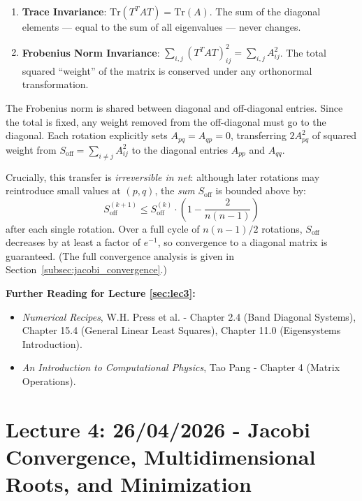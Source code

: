 \documentclass[12pt, a4paper]{article}
\begin{document}
\begin{enumerate}
    \item \textbf{Trace Invariance}: $\mathrm{Tr}(T^T A T) = \mathrm{Tr}(A)$. The sum of the diagonal elements — equal to the sum of all eigenvalues — never changes.
    \item \textbf{Frobenius Norm Invariance}: $\sum_{i,j}(T^T A T)_{ij}^2 = \sum_{i,j} A_{ij}^2$. The total squared ``weight'' of the matrix is conserved under any orthonormal transformation.
\end{enumerate}

\begin{tcolorbox}[colback=green!5!white,colframe=green!50!black,title=Why the Algorithm Must Converge]
The Frobenius norm is shared between diagonal and off-diagonal entries. Since the total is fixed, any weight removed from the off-diagonal must go to the diagonal. Each rotation explicitly sets $A_{pq} = A_{qp} = 0$, transferring $2A_{pq}^2$ of squared weight from $S_{\text{off}} = \sum_{i \neq j} A_{ij}^2$ to the diagonal entries $A_{pp}$ and $A_{qq}$.

Crucially, this transfer is \emph{irreversible in net}: although later rotations may reintroduce small values at $(p,q)$, the \emph{sum} $S_{\text{off}}$ is bounded above by:
\begin{equation}
S_{\text{off}}^{(k+1)} \leq S_{\text{off}}^{(k)} \cdot \left(1 - \frac{2}{n(n-1)}\right)
\end{equation}
after each single rotation. Over a full cycle of $n(n-1)/2$ rotations, $S_{\text{off}}$ decreases by at least a factor of $e^{-1}$, so convergence to a diagonal matrix is guaranteed. (The full convergence analysis is given in Section~\ref{subsec:jacobi_convergence}.)
\end{tcolorbox}

\vspace{0.5cm}
\noindent \textbf{Further Reading for Lecture \ref{sec:lec3}:}
\begin{itemize}
    \item \textit{Numerical Recipes}, W.H. Press et al. - Chapter 2.4 (Band Diagonal Systems), Chapter 15.4 (General Linear Least Squares), Chapter 11.0 (Eigensystems Introduction).
    \item \textit{An Introduction to Computational Physics}, Tao Pang - Chapter 4 (Matrix Operations).
\end{itemize}

\newpage
\section{Lecture 4: 26/04/2026 - Jacobi Convergence, Multidimensional Roots, and Minimization}
\label{sec:lec4}
\end{document}
